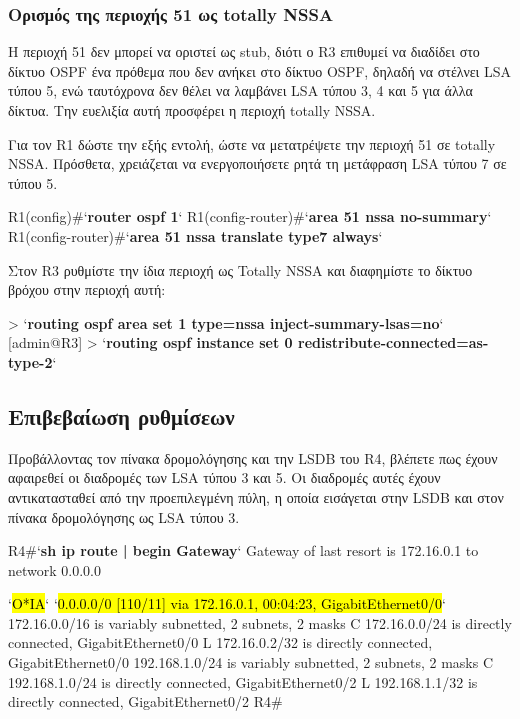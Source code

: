\documentclass{EdipyLabs} %
\begin{document}
\subsubsection*{Ορισμός της περιοχής 51 ως totally NSSA}

Η περιοχή 51 δεν μπορεί να οριστεί ως stub, διότι ο R3 επιθυμεί να διαδίδει στο δίκτυο OSPF ένα πρόθεμα που δεν ανήκει στο δίκτυο OSPF, δηλαδή να στέλνει LSA τύπου 5, ενώ ταυτόχρονα δεν θέλει να λαμβάνει LSA τύπου 3, 4 και 5 για άλλα δίκτυα. Την ευελιξία αυτή προσφέρει η περιοχή totally NSSA.

Για τον R1 δώστε την εξής εντολή, ώστε να μετατρέψετε την περιοχή 51 σε totally NSSA. Πρόσθετα, χρειάζεται να ενεργοποιήσετε ρητά τη μετάφραση LSA τύπου 7 σε τύπου 5.

\begin{CommandBox}
R1(config)#`\textbf{router ospf 1}`
R1(config-router)#`\textbf{area 51 nssa no-summary}`
R1(config-router)#`\textbf{area 51 nssa translate type7 always}`
\end{CommandBox}
 
Στον R3 ρυθμίστε την ίδια περιοχή ως Totally NSSA και διαφημίστε το δίκτυο βρόχου στην περιοχή αυτή:

\begin{CommandBox}
[admin@R3] > `\textbf{routing ospf area set 1 type=nssa inject-summary-lsas=no}`
[admin@R3] > `\textbf{routing ospf instance set 0 redistribute-connected=as-type-2}`
\end{CommandBox}

\subsection{Επιβεβαίωση ρυθμίσεων}

Προβάλλοντας τον πίνακα δρομολόγησης και την LSDB του R4, βλέπετε πως έχουν αφαιρεθεί οι διαδρομές των LSA τύπου 3 και 5. Οι διαδρομές αυτές έχουν αντικατασταθεί από την προεπιλεγμένη πύλη, η οποία εισάγεται στην LSDB και στον πίνακα δρομολόγησης ως LSA τύπου 3. 

\begin{CommandBox}
R4#`\textbf{sh ip route | begin Gateway}`
Gateway of last resort is 172.16.0.1 to network 0.0.0.0

`\hl{O*IA}`  `\hl{0.0.0.0/0 [110/11] via 172.16.0.1, 00:04:23, GigabitEthernet0/0}`
      172.16.0.0/16 is variably subnetted, 2 subnets, 2 masks
C        172.16.0.0/24 is directly connected, GigabitEthernet0/0
L        172.16.0.2/32 is directly connected, GigabitEthernet0/0
      192.168.1.0/24 is variably subnetted, 2 subnets, 2 masks
C        192.168.1.0/24 is directly connected, GigabitEthernet0/2
L        192.168.1.1/32 is directly connected, GigabitEthernet0/2
R4#
\end{CommandBox}
\end{document}
